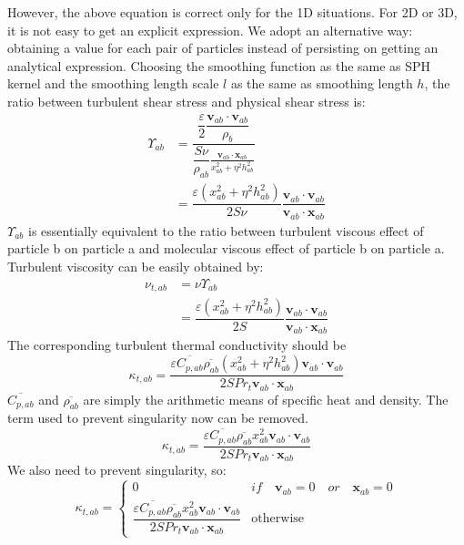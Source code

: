 However, the above equation is correct only for the 1D situations. For 2D or 3D, it is not easy to get an explicit expression. 
We adopt an alternative way: obtaining a value for each pair of particles instead of persisting on getting an analytical expression. Choosing the smoothing function as the same as SPH kernel and the smoothing length scale $l$ as the same as smoothing length $h$, the ratio between turbulent shear stress and physical shear stress is: 
\begin{equation}
\begin{split}
\Upsilon_{ab} &= \dfrac{\dfrac{\varepsilon}{2} \dfrac{\textbf{v}_{ab} \cdot \textbf{v}_{ab}}{\rho_b}}{\dfrac{S \nu}{\rho_{ab}} \frac{\textbf{v}_{ab} \cdot \textbf{x}_{ab}}{x_{ab}^2 + \eta^2 h_{ab}^2}} \\
 & = \dfrac{\varepsilon \left(x_{ab}^2 + \eta^2 h_{ab}^2\right)}{2 S \nu} \dfrac{\textbf{v}_{ab} \cdot \textbf{v}_{ab}}{\textbf{v}_{ab} \cdot \textbf{x}_{ab}}
\end{split}
\end{equation}
$\Upsilon_{ab}$ is essentially equivalent to the ratio between turbulent viscous effect of particle b on particle a and molecular viscous effect of particle b on particle a. Turbulent viscosity can be easily obtained by:
\begin{equation}
\begin{split}
\nu_{t,ab} &= \nu \Upsilon_{ab} \\
&= \dfrac{\varepsilon \left(x_{ab}^2 + \eta^2 h_{ab}^2\right)}{2 S} \dfrac{\textbf{v}_{ab} \cdot \textbf{v}_{ab}}{\textbf{v}_{ab} \cdot \textbf{x}_{ab}}
\end{split}
\end{equation}
The corresponding turbulent thermal conductivity should be
\begin{equation}
\kappa_{t,ab}=\dfrac{\varepsilon \overline{C_{p,ab}} \overline{\rho_{ab}} \left(x_{ab}^2 + \eta^2 h_{ab}^2\right) \textbf{v}_{ab} \cdot \textbf{v}_{ab}}{2 S Pr_t\textbf{v}_{ab} \cdot \textbf{x}_{ab}}
\end{equation}
$\overline{C_{p,ab}}$ and $\overline{\rho_{ab}}$ are simply the arithmetic means of specific heat and density. The term used to prevent singularity now can be removed. 
\begin{equation}
\kappa_{t,ab}=\dfrac{\varepsilon \overline{C_{p,ab}} \overline{\rho_{ab}} x_{ab}^2 \textbf{v}_{ab} \cdot \textbf{v}_{ab}}{2 S Pr_t\textbf{v}_{ab} \cdot \textbf{x}_{ab} }
\end{equation}
We also need to prevent singularity, so: 
\begin{equation}
\kappa_{t,ab}= 
\begin{cases} 
      0 & if  \quad \textbf{v}_{ab}=0 \quad or \quad \textbf{x}_{ab}=0 \\
      \dfrac{\varepsilon \overline{C_{p,ab}} \overline{\rho_{ab}} x_{ab}^2 \textbf{v}_{ab} \cdot \textbf{v}_{ab}}{2 S Pr_t\textbf{v}_{ab} \cdot \textbf{x}_{ab} } & \text{otherwise}
\end{cases}
\label{eq:SPH-LANS-heat-conductivity}
\end{equation}

